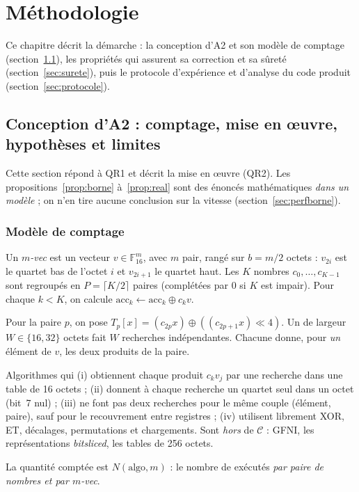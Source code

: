 \chapter{Méthodologie}
\label{ch:methodo}

Ce chapitre décrit la démarche : la conception d'A2 et son modèle de comptage (section~\ref{sec:a2}), les propriétés qui assurent sa correction et sa sûreté (section~\ref{sec:surete}), puis le protocole d'expérience et d'analyse du code produit (section~\ref{sec:protocole}).

\section{Conception d'A2 : comptage, mise en œuvre, hypothèses et limites}\label{sec:a2}
Cette section répond à QR1 et décrit la mise en œuvre (QR2). Les propositions~\ref{prop:borne} à~\ref{prop:real} sont des énoncés mathématiques \emph{dans un modèle} ; on n'en tire aucune conclusion sur la vitesse (section~\ref{sec:perfborne}).

\subsection{Modèle de comptage}
\begin{definition}[Données]
Un \emph{$m$-vec} est un vecteur $v\in\mathbb{F}_{16}^m$, avec $m$ pair, rangé sur $b=m/2$ octets : $v_{2i}$ est le quartet bas de l'octet $i$ et $v_{2i+1}$ le quartet haut. Les $K$ nombres $c_0,\dots,c_{K-1}$ sont regroupés en $P=\lceil K/2\rceil$ paires (complétées par 0 si $K$ est impair). Pour chaque $k<K$, on calcule $\mathrm{acc}_k\leftarrow\mathrm{acc}_k\oplus c_k v$.
\end{definition}
Pour la paire $p$, on pose $T_p[x]=(c_{2p}x)\oplus((c_{2p+1}x)\ll4)$. Un \vpshufb{} de largeur $W\in\{16,32\}$ octets fait $W$ recherches indépendantes. Chacune donne, pour \emph{un} élément de $v$, les deux produits de la paire.

\begin{definition}
Algorithmes qui (i) obtiennent chaque produit $c_kv_j$ par une recherche dans une table de 16 octets ; (ii) donnent à chaque recherche un quartet seul dans un octet (bit~7 nul) ; (iii) ne font pas deux recherches pour le même couple (élément, paire), sauf pour le recouvrement entre registres ; (iv) utilisent librement XOR, ET, décalages, permutations et chargements. Sont \emph{hors} de $\mathcal{C}$ : GFNI, les représentations \emph{bitsliced}, les tables de 256 octets.
\end{definition}
La quantité comptée est $N(\text{algo},m)$ : le nombre de \vpshufb{} exécutés \emph{par paire de nombres et par $m$-vec}.

